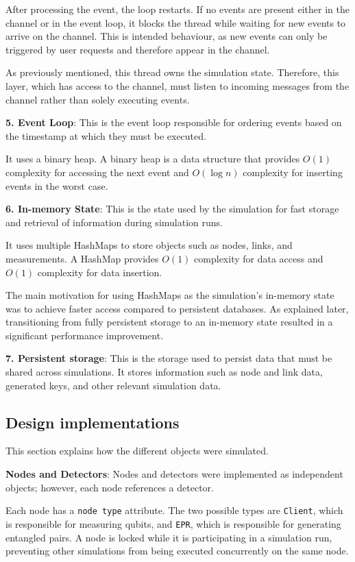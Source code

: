 After processing the event, the loop restarts. If no events are present either in the channel or in the event loop, it blocks the thread while waiting for new events to arrive on the channel. This is intended behaviour, as new events can only be triggered by user requests and therefore appear in the channel.

As previously mentioned, this thread owns the simulation state. Therefore, this layer, which has access to the channel, must listen to incoming messages from the channel rather than solely executing events.

\textbf{5. Event Loop}: This is the event loop responsible for ordering events based on the timestamp at which they must be executed.

It uses a binary heap. A binary heap is a data structure that provides $O(1)$ complexity for accessing the next event and $O(\log n)$ complexity for inserting events in the worst case.

\textbf{6. In-memory State}: This is the state used by the simulation for fast storage and retrieval of information during simulation runs.

It uses multiple HashMaps to store objects such as nodes, links, and measurements. A HashMap provides $O(1)$ complexity for data access and $O(1)$ complexity for data insertion.

The main motivation for using HashMaps as the simulation’s in-memory state was to achieve faster access compared to persistent databases. As explained later, transitioning from fully persistent storage to an in-memory state resulted in a significant performance improvement.

\textbf{7. Persistent storage}: This is the storage used to persist data that must be shared across simulations. It stores information such as node and link data, generated keys, and other relevant simulation data.

\subsection{Design implementations}
This section explains how the different objects were simulated.

\textbf{Nodes and Detectors}: Nodes and detectors were implemented as independent objects; however, each node references a detector.

Each node has a \texttt{node type} attribute. The two possible types are \texttt{Client}, which is responsible for measuring qubits, and \texttt{EPR}, which is responsible for generating entangled pairs. A node is locked while it is participating in a simulation run, preventing other simulations from being executed concurrently on the same node.

